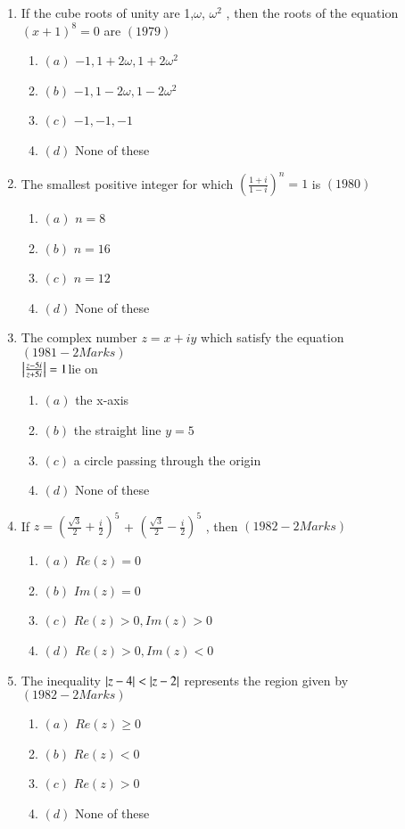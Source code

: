\documentclass[journal,12pt,twocolumn]{IEEEtran}
\theoremstyle{remark}
\begin{document}
\begin{enumerate}
    

\item If the cube roots of unity are 1,$\omega $, $\omega^2$ , then the roots of the equation $(x+1)^8 = 0$ are                     \hfill$(1979)$
\begin{enumerate}
  \item $(a)$  $-1 , 1+2\omega ,1+2\omega^2 $
\item $(b)$  $-1  , 1-2\omega , 1-2\omega^2$
\item $(c)$  $ -1 , -1 ,-1 $ 
\item $(d)$   None of these\\
\end{enumerate}
\item  The smallest positive integer for which
    $(\frac{1+i}{1-i})^n = 1$ is  \hfill$(1980)$     
\begin{enumerate}
\item $(a)$  $n=8$
\item $(b)$  $n=16$
\item $(c)$  $n=12$
\item $(d)$  None of these\\ 
\end{enumerate}
\item The complex number $z= x+iy$ which satisfy the equation \hfill$(1981 - 2 Marks)$\\
     $\left\vert\frac{z-5i}{z+5i}\right\vert = 1 $lie on 
\begin{enumerate}
\item $(a)$  the x-axis
\item $(b)$  the straight line $y=5$
 \item $(c)$  a circle passing through the origin 
 \item $(d)$  None of these\\
 \end{enumerate}
\item  If $z=(\frac{\sqrt{3}}{2} + \frac{i}{2})^5$ + $(\frac{\sqrt{3}}{2} - \frac{i}{2})^5$ , then \hfill$(1982 - 2 Marks)$
\begin{enumerate}
\item $(a)$ $Re(z)=0$
\item $(b)$ $Im(z)=0$
\item $(c)$ $Re(z)>0, Im(z)>0$
\item $(d)$ $Re(z)>0,  Im(z)<0$\\
\end{enumerate}
\item The inequality $\left\vert z-4\right\vert<\left\vert z-2\right\vert$ represents the region given by \hfill$(1982 - 2 Marks)$
\begin{enumerate}
\item $(a)$ $Re(z)\ge0$
\item $(b)$ $Re(z)<0$ 
\item $(c)$ $Re(z)>0$ 
\item $(d)$ None of these
\end{enumerate}
\end{enumerate}
\end{document}
